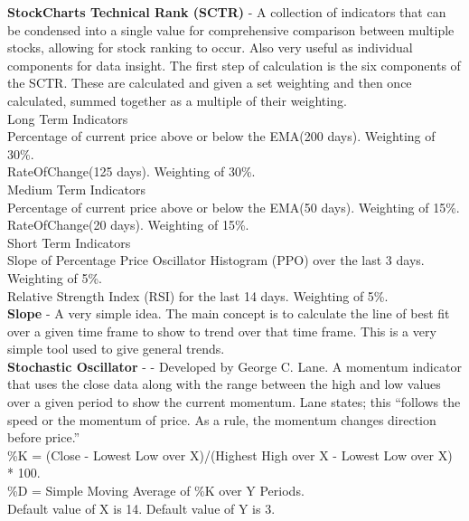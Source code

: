 \documentclass[conference]{IEEEtran}
\begin{document}

\noindent
\textbf{StockCharts Technical Rank (SCTR)} - A collection of indicators that can be condensed into a single value for comprehensive comparison between multiple stocks, allowing for stock ranking to occur. Also very useful as individual components for data insight. The first step of calculation is the six components of the SCTR. These are calculated and given a set weighting and then once calculated, summed together as a multiple of their weighting. \\

\noindent
Long Term Indicators\\
Percentage of current price above or below the EMA(200 days). Weighting of 30\%. \\
RateOfChange(125 days). Weighting of 30\%. \\

\noindent
Medium Term Indicators\\
Percentage of current price above or below the EMA(50 days). Weighting of 15\%. \\
RateOfChange(20 days). Weighting of 15\%. \\

\noindent
Short Term Indicators\\
Slope of Percentage Price Oscillator Histogram (PPO) over the last 3 days. Weighting of 5\%. \\
Relative Strength Index (RSI) for the last 14 days. Weighting of 5\%. \\

\noindent
\textbf{Slope} - A very simple idea. The main concept is to calculate the line of best fit over a given time frame to show to trend over that time frame. This is a very simple tool used to give general trends.\\

\noindent
\textbf{Stochastic Oscillator} - \cite{Murphy1999} - Developed by George C. Lane. A momentum indicator that uses the close data along with the range between the high and low values over a given period to show the current momentum. Lane states; this ``follows the speed or the momentum of price. As a rule, the momentum changes direction before price.'' \\

\noindent
\%K = (Close - Lowest Low over X)/(Highest High over X - Lowest Low over X) * 100.\\
\%D = Simple Moving Average of \%K over Y Periods. \\
Default value of X is 14. Default value of Y is 3.\\
\end{document}
